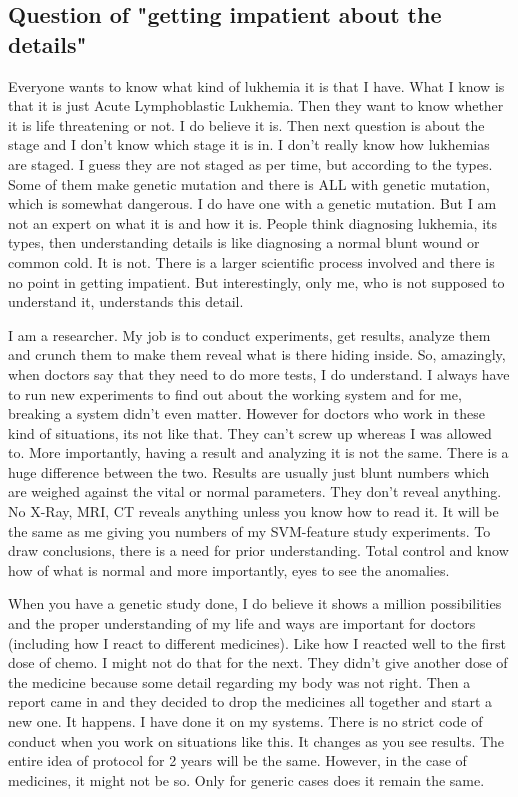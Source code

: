 \subsection*{Question of "getting impatient about the details"} 

Everyone wants to know what kind of lukhemia it is that I have. What I know is that it is just Acute 
Lymphoblastic Lukhemia. Then they want to know whether it is life threatening or not. I do believe 
it is. Then next question is about the stage and I don't know which stage it is in. I don't really know 
how lukhemias are staged. I guess they are not staged as per time, but according to the types. 
Some of them make genetic mutation and there is ALL with genetic mutation, which is somewhat 
dangerous. I do have one with a genetic mutation. But I am not an expert on what it is and 
how it is. People think diagnosing lukhemia, its types, then understanding details is like 
diagnosing a normal blunt wound or common cold. It is not. There is a larger scientific process 
involved and there is no point in getting impatient. But interestingly, only me, who is not 
supposed to understand it, understands this detail.

I am a researcher. My job is to conduct experiments, get results, analyze them and crunch them 
to make them reveal what is there hiding inside. So, amazingly, when doctors say that they need to do 
more tests, I do understand. I always have to run new experiments to find out about the working system 
and for me, breaking a system didn't even matter. However for doctors who work in these kind of 
situations, its not like that. They can't screw up whereas I was allowed to. More importantly, having 
a result and analyzing it is not the same. There is a huge difference between the two. Results are 
usually just blunt numbers which are weighed against the vital or normal parameters. They 
don't reveal anything. No X-Ray, MRI, CT reveals anything unless you know how to read it. It 
will be the same as me giving you numbers of my SVM-feature study experiments. To draw conclusions, 
there is a need for prior understanding. Total control and know how of what is normal and more 
importantly, eyes to see the anomalies. 

When you have a genetic study done, I do believe it shows a million possibilities and the proper 
understanding of my life and ways are important for doctors (including how I react to different 
medicines). Like how I reacted well to the first dose of chemo. I might not do that for the next. They didn't
give another dose of the medicine because some detail regarding my body was not right. Then a report came in and 
they decided to drop the medicines all together and start a new one. It happens. I have done it on 
my systems. There is no strict code of conduct when you work on situations like this. It changes 
as you see results. The entire idea of protocol for 2 years will be the same. However, in the case of medicines, it might not be so. Only for 
generic cases does it remain the same. 

